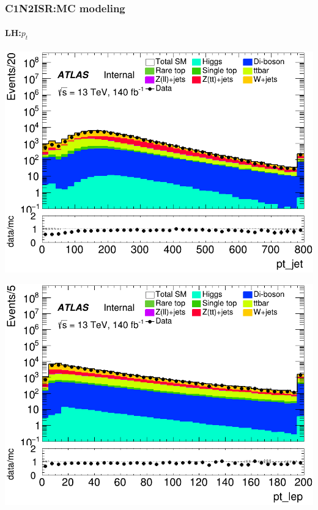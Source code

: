 \documentclass[usenames,dvipsnames]{beamer}
\begin{document}
\begin{frame}
\frametitle{C1N2ISR:MC modeling}
\framesubtitle{LH:\quad $p_t$}
    \begin{minipage}{0.32\textwidth}
        \centering
        \includegraphics[width=\textwidth]{graphics/LH_met/LH_met_pt_jet.png}
    \end{minipage}
    \hfill
    \begin{minipage}{0.32\textwidth}
        \centering
        \includegraphics[width=\textwidth]{graphics/LH_met/LH_met_pt_lep.png}
    \end{minipage}
    \hfill
    \begin{minipage}{0.32\textwidth}
        \centering

\end{minipage}
\end{frame}
\end{document}
